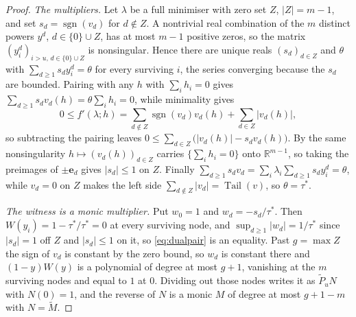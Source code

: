 \documentclass[11pt]{article}
\theoremstyle{definition}
\theoremstyle{plain}
\newcommand{\R}{\mathbb R}
\DeclareMathOperator{\Tail}{Tail}
\DeclareMathOperator{\sgn}{sgn}
\begin{document}
\begin{proof}
\emph{The multipliers.}  Let $\lambda$ be a full minimiser with zero set
$Z$, $|Z|=m-1$, and set $s_d=\sgn(v_d)$ for $d\notin Z$.  A nontrivial real
combination of the $m$ distinct powers $y^d$, $d\in\{0\}\cup Z$, has at most
$m-1$ positive zeros, so the matrix $(y_i^d)_{i>u,\,d\in\{0\}\cup Z}$ is
nonsingular.  Hence there are unique reals $(s_d)_{d\in Z}$ and $\theta$
with $\sum_{d\ge1}s_dy_i^d=\theta$ for every surviving $i$, the series
converging because the $s_d$ are bounded.  Pairing with any $h$ with
$\sum_ih_i=0$ gives $\sum_{d\ge1}s_dv_d(h)=\theta\sum_ih_i=0$, while
minimality gives
\[
  0\le f'(\lambda;h)=\sum_{d\notin Z}\sgn(v_d)v_d(h)+\sum_{d\in Z}|v_d(h)|,
\]
so subtracting the pairing leaves
$0\le\sum_{d\in Z}\bigl(|v_d(h)|-s_dv_d(h)\bigr)$.  By the same
nonsingularity $h\mapsto(v_d(h))_{d\in Z}$ carries $\{\sum_ih_i=0\}$ onto
$\R^{m-1}$, so taking the preimages of $\pm\mathbf e_d$ gives $|s_d|\le1$ on $Z$.
Finally $\sum_{d\ge1}s_dv_d=\sum_i\lambda_i\sum_{d\ge1}s_dy_i^d=\theta$,
while $v_d=0$ on $Z$ makes the left side $\sum_{d\notin Z}|v_d|=\Tail(v)$,
so $\theta=\tau^*$.

\emph{The witness is a monic multiplier.}  Put $w_0=1$ and
$w_d=-s_d/\tau^*$.  Then $W(y_i)=1-\tau^*/\tau^*=0$ at every surviving node,
and $\sup_{d\ge1}|w_d|=1/\tau^*$ since $|s_d|=1$ off $Z$ and $|s_d|\le1$ on
it, so \eqref{eq:dualpair} is an equality.  Past $g=\max Z$ the sign of
$v_d$ is constant by the zero bound, so $w_d$ is constant there and
$(1-y)W(y)$ is a polynomial of degree at most $g+1$, vanishing at the $m$
surviving nodes and equal to $1$ at $0$.  Dividing out those nodes writes it
as $\widetilde P_uN$ with $N(0)=1$, and the reverse of $N$ is a monic $M$ of
degree at most $g+1-m$ with $N=\widetilde M$.
\end{proof}
\end{document}
